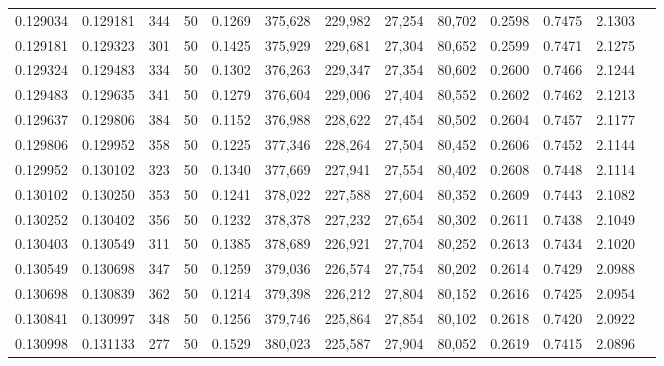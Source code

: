 \begin{tabular}{rrrrrrrrrrrrr}
0.129034 & 0.129181 &   344 &  50 &                                     0.1269 & 375,628 & 229,982 &  27,254 &  80,702 & 0.2598 & 0.7475 & 2.1303 \\
0.129181 & 0.129323 &   301 &  50 &                                     0.1425 & 375,929 & 229,681 &  27,304 &  80,652 & 0.2599 & 0.7471 & 2.1275 \\
0.129324 & 0.129483 &   334 &  50 &                                     0.1302 & 376,263 & 229,347 &  27,354 &  80,602 & 0.2600 & 0.7466 & 2.1244 \\
0.129483 & 0.129635 &   341 &  50 &                                     0.1279 & 376,604 & 229,006 &  27,404 &  80,552 & 0.2602 & 0.7462 & 2.1213 \\
0.129637 & 0.129806 &   384 &  50 &                                     0.1152 & 376,988 & 228,622 &  27,454 &  80,502 & 0.2604 & 0.7457 & 2.1177 \\
0.129806 & 0.129952 &   358 &  50 &                                     0.1225 & 377,346 & 228,264 &  27,504 &  80,452 & 0.2606 & 0.7452 & 2.1144 \\
0.129952 & 0.130102 &   323 &  50 &                                     0.1340 & 377,669 & 227,941 &  27,554 &  80,402 & 0.2608 & 0.7448 & 2.1114 \\
0.130102 & 0.130250 &   353 &  50 &                                     0.1241 & 378,022 & 227,588 &  27,604 &  80,352 & 0.2609 & 0.7443 & 2.1082 \\
0.130252 & 0.130402 &   356 &  50 &                                     0.1232 & 378,378 & 227,232 &  27,654 &  80,302 & 0.2611 & 0.7438 & 2.1049 \\
0.130403 & 0.130549 &   311 &  50 &                                     0.1385 & 378,689 & 226,921 &  27,704 &  80,252 & 0.2613 & 0.7434 & 2.1020 \\
0.130549 & 0.130698 &   347 &  50 &                                     0.1259 & 379,036 & 226,574 &  27,754 &  80,202 & 0.2614 & 0.7429 & 2.0988 \\
0.130698 & 0.130839 &   362 &  50 &                                     0.1214 & 379,398 & 226,212 &  27,804 &  80,152 & 0.2616 & 0.7425 & 2.0954 \\
0.130841 & 0.130997 &   348 &  50 &                                     0.1256 & 379,746 & 225,864 &  27,854 &  80,102 & 0.2618 & 0.7420 & 2.0922 \\
0.130998 & 0.131133 &   277 &  50 &                                     0.1529 & 380,023 & 225,587 &  27,904 &  80,052 & 0.2619 & 0.7415 & 2.0896 \\

\end{tabular}
